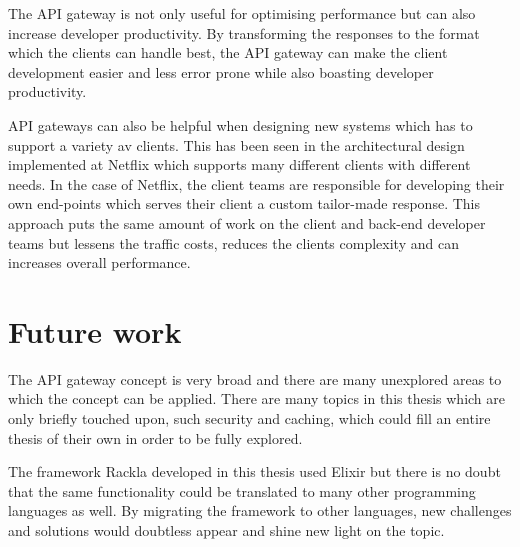 \documentclass{cslthse-msc}
\begin{document}
The API gateway is not only useful for optimising performance but can also increase developer productivity. By transforming the responses to the format which the clients can handle best, the API gateway can make the client development easier and less error prone while also boasting developer productivity.

API gateways can also be helpful when designing new systems which has to support a variety av clients. This has been seen in the architectural design implemented at Netflix\cite{netflix} which supports many different clients with different needs. In the case of Netflix, the client teams are responsible for developing their own end-points which serves their client a custom tailor-made response. This approach puts the same amount of work on the client and back-end developer teams but lessens the traffic costs, reduces the clients complexity and can increases overall performance.

\section{Future work}

The API gateway concept is very broad and there are many unexplored areas to which the concept can be applied. There are many topics in this thesis which are only briefly touched upon, such security and caching, which could fill an entire thesis of their own in order to be fully explored.

The framework Rackla developed in this thesis used Elixir but there is no doubt that the same functionality could be translated to many other programming languages as well. By migrating the framework to other languages, new challenges and solutions would doubtless appear and shine new light on the topic. 

\cleardoublepage
{}
{}


\end{document}
